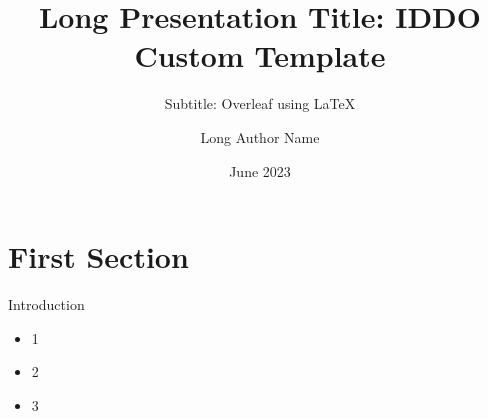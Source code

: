 \documentclass{beamer}
\title[A Short Title]{Long Presentation Title: IDDO Custom Template}
\subtitle{Subtitle: Overleaf using \LaTeX}
\author[Short Author Name]{Long Author Name}
\institute[IDDO]{IDDO, University of Oxford}
\date{June 2023}
\begin{document}
{
\begin{frame}{}
    \titlepage
\end{frame}
}


\section{First Section}
\begin{frame}{Introduction}
    \begin{itemize}
        \item 1
        \item 2
        \item 3
    \end{itemize}
\end{frame}
\end{document}
